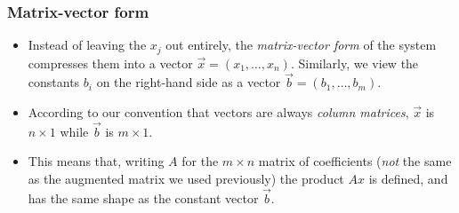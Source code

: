 \begin{frame}

\frametitle{Matrix-vector form}
\label{matrix-vectorform}

\begin{itemize}
\item Instead of leaving the $ x_j $ out entirely, the \emph{matrix-vector form} of the system compresses them into a vector $ \vec{x} = (x_1, \ldots, x_n) $. Similarly, we view the constants $ b_i $ on the right-hand side as a vector $ \vec{b} = (b_1, \ldots, b_m) $. 

\item According to our convention that vectors are always \emph{column matrices}, $ \vec{x} $ is $ n \times 1 $ while $ \vec{b} $ is $ m \times 1 $.

\item This means that, writing $ A $ for the $ m \times n $ matrix of coefficients (\emph{not} the same as the augmented matrix we used previously) the product $ Ax $ is defined, and has the same shape as the constant vector $ \vec{b} $.

\end{itemize}

\end{frame}

